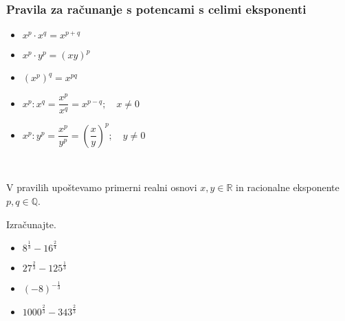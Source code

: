             \subsubsection*{Pravila za računanje s potencami s celimi eksponenti}
                
                        \begin{itemize}
                            \item $\displaystyle x^p\cdot x^q=x^{p+q}$
                            \item $\displaystyle x^p\cdot y^p=(xy)^p$
                            \item $\displaystyle \left(x^p\right)^q=x^{pq}$
                        \end{itemize}
                        \begin{itemize}
                            \item $\displaystyle x^p:x^q=\dfrac{x^p}{x^q}=x^{p-q}; \quad x\neq 0$
                            \item $\displaystyle x^p:y^p=\dfrac{x^p}{y^p}=\left(\dfrac{x}{y}\right)^p; \quad y\neq 0$
                        \end{itemize}
                
                ~

                V pravilih upoštevamo primerni realni osnovi $x,y\in\mathbb{R}$ in racionalne eksponente $p,q\in\mathbb{Q}$.

            
        




        
            \begin{naloga}
                Izračunajte.
                \begin{itemize}
                    \item $\displaystyle 8^\frac{1}{3}-16^\frac{2}{4}$ 
                    \item $\displaystyle 27^\frac{2}{3}-125^\frac{1}{3}$ 
                    \item $\displaystyle \left(-8\right)^{-\frac{1}{3}}$ 
                    \item $\displaystyle 1000^\frac{2}{3}-343^\frac{2}{3}$ 
                \end{itemize}
            \end{naloga}
        


